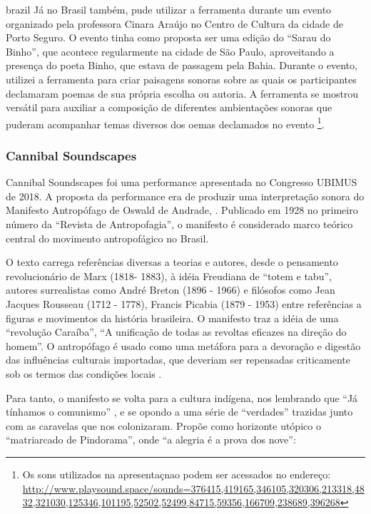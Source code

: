 \begin{otherlanguage*}{brazil}
Já no Brasil também, pude utilizar a ferramenta durante um evento organizado pela professora Cinara Araújo no Centro de Cultura da cidade de Porto Seguro. O evento tinha como proposta ser uma edição do ``Sarau do Binho'', que acontece regularmente na cidade de São Paulo, aproveitando a presença do poeta Binho, que estava de passagem pela Bahia. Durante o evento, utilizei a ferramenta para criar paisagens sonoras sobre as quais os participantes declamaram poemas de sua própria escolha ou autoria. A ferramenta se mostrou versátil para auxiliar a composição de diferentes ambientações sonoras que puderam acompanhar temas diversos dos oemas declamados no evento \footnote{Os sons utilizados na apresentaçnao podem ser acessados no endereço: \url{http://www.playsound.space/sounds=376415,419165,346105,320306,213318,4832,321030,125346,101195,52502,52499,84715,59356,166709,238689,396268}}.


\subsubsection{Cannibal Soundscapes}
Cannibal Soundscapes foi uma performance apresentada no Congresso UBIMUS de 2018. A proposta da performance era de produzir uma interpretação sonora do Manifesto Antropófago de Oswald de Andrade, \cite{Andrade1928}. Publicado em 1928 no primeiro número da ``Revista de Antropofagia'', o manifesto é considerado  marco teórico central do movimento antropofágico no Brasil.

O texto carrega referências diversas a teorias e autores, desde o pensamento revolucionário de Marx (1818- 1883), à idéia Freudiana de ``totem e tabu'', autores surrealistas como André Breton (1896 - 1966) e filósofos como Jean Jacques Rousseau (1712 - 1778), Francis Picabia (1879 - 1953) entre referências a figuras e movimentos da história brasileira. O manifesto traz a idéia de uma ``revolução Caraíba'', ``A unificação de todas as revoltas eficazes na direção do homem''. O antropófago é usado como uma metáfora para a devoração e digestão das influências culturais importadas, que deveriam ser repensadas criticamente sob os termos das condições locais \cite{Berg-1999}.

Para tanto, o manifesto se volta para a cultura indígena, nos lembrando que ``Já tínhamos o comunismo'' \cite{Bradley2007}, e se opondo a uma série de ``verdades'' trazidas junto com as caravelas que nos colonizaram. Propõe como horizonte utópico o ``matriarcado de Pindorama'', onde ``a alegria é a prova dos nove'':


\end{otherlanguage*}
